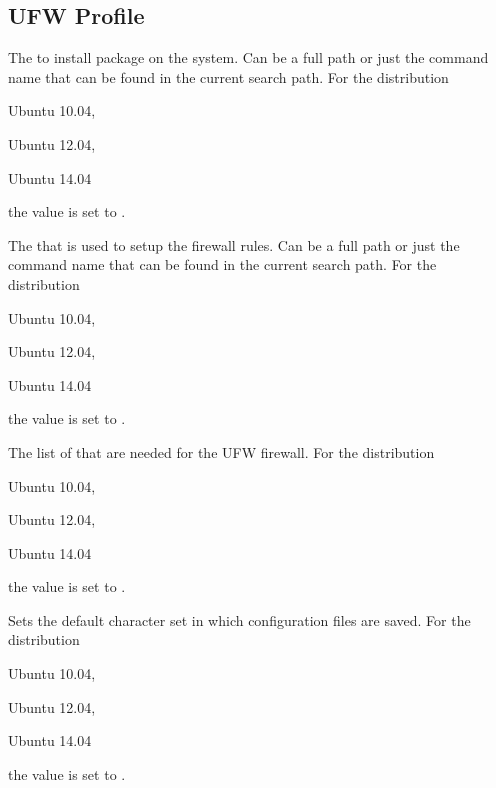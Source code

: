 \label{sec:firewall_profile}
\subsection{UFW Profile}


The  to install package on the system. Can be a full path or
just the command name that can be found in the current search path. 
For the distribution
\begin{inparaitem}
\item[\TheDistribution{ubuntu}] Ubuntu 10.04,
\item[\TheDistribution{ubuntu}] Ubuntu 12.04,
\item[\TheDistribution{ubuntu}] Ubuntu 14.04
\end{inparaitem}
the value is set to .


The  that is used to setup the firewall rules. Can be a full path or
just the command name that can be found in the current search path. 
For the distribution
\begin{inparaitem}
\item[\TheDistribution{ubuntu}] Ubuntu 10.04,
\item[\TheDistribution{ubuntu}] Ubuntu 12.04,
\item[\TheDistribution{ubuntu}] Ubuntu 14.04
\end{inparaitem}
the value is set to .


The list of  that are needed for the UFW firewall. 
For the distribution
\begin{inparaitem}
\item[\TheDistribution{ubuntu}] Ubuntu 10.04,
\item[\TheDistribution{ubuntu}] Ubuntu 12.04,
\item[\TheDistribution{ubuntu}] Ubuntu 14.04
\end{inparaitem}
the value is set to .


Sets the default character set  in which configuration files are 
saved. For the distribution
\begin{inparaitem}
\item[\TheDistribution{ubuntu}] Ubuntu 10.04,
\item[\TheDistribution{ubuntu}] Ubuntu 12.04,
\item[\TheDistribution{ubuntu}] Ubuntu 14.04
\end{inparaitem}
the value is set to .
